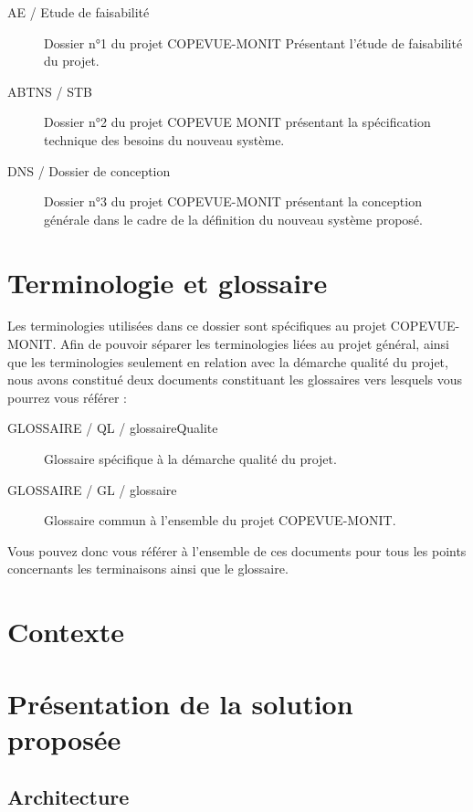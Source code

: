 \documentclass{mise_en_page}
\begin{document}
\begin{description}
	\item[AE / Etude de faisabilité] Dossier n°1 du projet COPEVUE-MONIT Présentant l'étude de faisabilité du projet.
	\item[ABTNS / STB ] Dossier n°2 du projet COPEVUE MONIT présentant la spécification technique des besoins du nouveau système.
	\item[DNS / Dossier de conception ] Dossier n°3 du projet COPEVUE-MONIT présentant la conception générale dans le cadre de la définition du nouveau système proposé.
\end{description}

\section{Terminologie et glossaire}

Les terminologies utilisées dans ce dossier sont spécifiques au projet COPEVUE-MONIT. Afin de pouvoir séparer les terminologies liées au projet général, ainsi que les terminologies seulement en relation avec la démarche qualité du projet, nous avons constitué deux documents constituant les glossaires vers lesquels vous pourrez vous référer :

\begin{description}
	\item[GLOSSAIRE / QL / glossaireQualite ] Glossaire spécifique à la démarche qualité du projet.
	\item[GLOSSAIRE / GL / glossaire ] Glossaire commun à l'ensemble du projet COPEVUE-MONIT.
\end{description}

Vous pouvez donc vous référer à l'ensemble de ces documents pour tous les points concernants les terminaisons ainsi que le glossaire.

\section{Contexte}

\section{Présentation de la solution proposée}

\subsection{Architecture}
\end{document}
